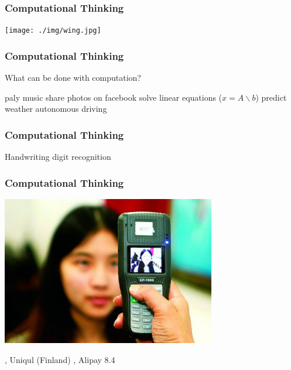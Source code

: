 \documentclass[11pt]{beamer}
\begin{document}
\begin{frame}
	\frametitle{Computational Thinking}
	\Enlarge
	
	\texttt{[image: ./img/wing.jpg]}
\end{frame}


\begin{frame}
	\frametitle{Computational Thinking}
	\Enlarge
	\begin{itemize}
		\myitem What can be done with computation? \pause
		\begin{itemize}
	  		\mysubitem paly music \pause
			\mysubitem share photos on facebook \pause
			\mysubitem solve linear equations ($x = A \backslash b$) \pause
			\mysubitem predict weather \pause
			\mysubitem autonomous driving
		\end{itemize}
	\end{itemize}
\end{frame}


\begin{frame}
	\frametitle{Computational Thinking}
	\Enlarge
	Handwriting digit recognition
	
\end{frame}


\begin{frame}
	\frametitle{Computational Thinking}
	\Enlarge
	\hspace{5mm} \includegraphics[width=0.7\textwidth]{./img/facepay.jpg}\\ \pause
	\begin{itemize}
	  		, Uniqul (Finland) \pause
			, Alipay 8.4
	\end{itemize}
\end{frame}
\end{document}
